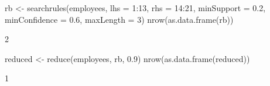\begin{Schunk}
% --begin: "reduce"
\begin{Sinput}
 rb <- searchrules(employees, lhs = 1:13, rhs = 14:21, minSupport = 0.2, minConfidence = 0.6, 
     maxLength = 3)
 nrow(as.data.frame(rb))
\end{Sinput}
\begin{Soutput}
[1] 2
\end{Soutput}
\begin{Sinput}
 reduced <- reduce(employees, rb, 0.9)
 nrow(as.data.frame(reduced))
\end{Sinput}
\begin{Soutput}
[1] 1
\end{Soutput}
%
% --end: "reduce"
\end{Schunk}
